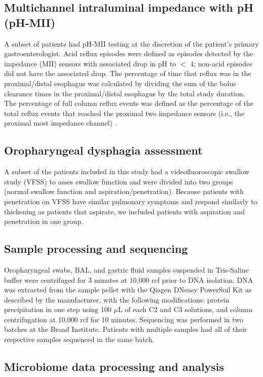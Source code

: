 \subsection{Multichannel intraluminal impedance with pH (pH-MII)}

A subset of patients had pH-MII testing at the discretion of the patient's primary gastroenterologist.
Acid reflux episodes were defined as episodes detected by the impedance (MII) sensors with associated drop in pH to $<$ 4; non-acid episodes did not have the associated drop.
The percentage of time that reflux was in the proximal/distal esophagus was calculated by dividing the sum of the bolus clearance times in the proximal/distal esophagus by the total study duration.
The percentage of full column reflux events was defined as the percentage of the total reflux events that reached the proximal two impedance sensors (i.e., the proximal most impedance channel) \cite{rosen2004impedance}.

\subsection{Oropharyngeal dysphagia assessment}

A subset of the patients included in this study had a videofluoroscopic swallow study (VFSS) to asses swallow function and were divided into two groups (normal swallow function and aspiration/penetration).
Because patients with penetration on VFSS have similar pulmonary symptoms and respond similarly to thickening as patients that aspirate, we included patients with aspiration and penetration in one group.

\subsection{Sample processing and sequencing}

Oropharyngeal swabs, BAL, and gastric fluid samples suspended in Tris-Saline buffer were centrifuged for 3 minutes at 10,000 rcf prior to DNA isolation.
DNA was extracted from the sample pellet with the Qiagen DNeasy PowerSoil Kit as described by the manufacturer, with the following modifications: protein precipitation in one step using 100 $\mu$L of each C2 and C3 solutions, and column centrifugation at 10,000 rcf for 10 minutes.
Sequencing was performed in two batches at the Broad Institute.
Patients with multiple samples had all of their respective samples sequenced in the same batch.

\subsection{Microbiome data processing and analysis}

